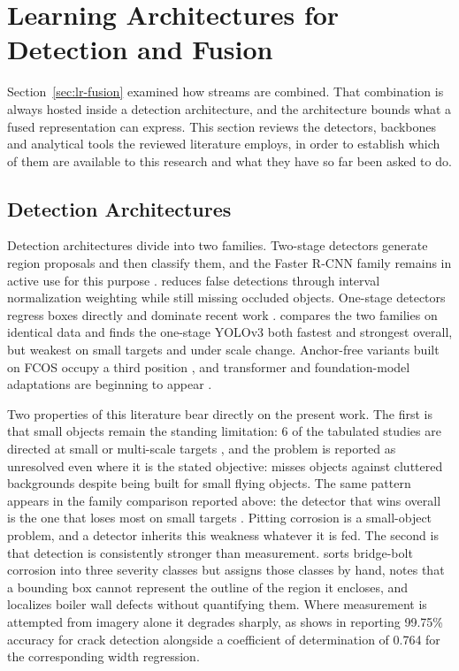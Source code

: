 \section{Learning Architectures for Detection and Fusion}
\label{sec:lr-architectures}

Section~\ref{sec:lr-fusion} examined how streams are combined. That combination
is always hosted inside a detection architecture, and the architecture bounds
what a fused representation can express. This section reviews the detectors,
backbones and analytical tools the reviewed literature employs, in order to
establish which of them are available to this research and what they have so far
been asked to do.

\subsection{Detection Architectures}

Detection architectures divide into two families. Two-stage detectors generate
region proposals and then classify them, and the Faster R-CNN family remains in
active use for this purpose \citep{Wu2026,Zheng2023,Gong2022}. \citet{Wu2026}
reduces false detections through interval normalization weighting while still
missing occluded objects.
One-stage detectors regress boxes directly and dominate recent work
\citep{Han2022,Tao2021,Sun2023,Liu2026a,Wang2026a,Sun2022,Li2024b,Morita2024,Zhao2026}. \citet{Srivastava2021} compares the two families on identical
data and finds the one-stage YOLOv3 both fastest and strongest overall, but
weakest on small targets and under scale change. Anchor-free variants built on
FCOS occupy a third position \citep{Chen2025,Zhang2024}, and transformer and foundation-model
adaptations are beginning to appear \citep{Zhang2026c,Mbietieu2025}.

Two properties of this literature bear directly on the present work. The first
is that small objects remain the standing limitation: 6 of the tabulated
studies are directed at small or multi-scale targets
\citep{Tao2021,Chen2025,Jiang2025,Zhang2024,Wang2026a,Han2022}, and the problem
is reported as unresolved even where it is the stated objective:
\citet{Tao2021} misses objects against cluttered backgrounds despite being built
for small flying objects. The same pattern appears in the family comparison reported above: the
detector that wins overall is the one that loses most on small targets
\citep{Srivastava2021}. Pitting corrosion is a small-object problem, and a
detector inherits this weakness whatever it is fed.
The second is that detection is consistently stronger than measurement. \citet{Li2024b}
sorts bridge-bolt corrosion into three severity classes but assigns those classes
by hand, \citet{Zhao2026} notes that a bounding box cannot represent the outline of the
region it encloses, and \citet{Sun2022} localizes boiler wall defects without
quantifying them. Where measurement is attempted from imagery alone it degrades
sharply, as \citet{Su2024} shows in reporting 99.75\% accuracy for crack detection
alongside a coefficient of determination of 0.764 for the corresponding width
regression.

